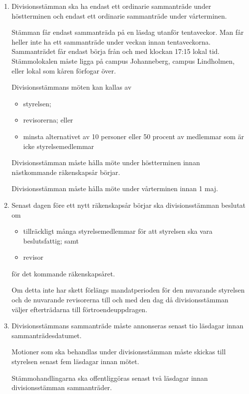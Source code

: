 \documentclass{dvd}
\begin{document}
	\begin{enumerate}[label=\arabic* §, ref=\arabic*]
		\item Divisionsstämman ska ha endast ett ordinarie sammanträde under höstterminen och endast ett ordinarie sammanträde under vårterminen.

		Stämman får endast sammanträda på en läsdag utanför tentaveckor.
		Man får heller inte ha ett sammanträde under veckan innan tentaveckorna.
		Sammanträdet får endast börja från och med klockan 17:15 lokal tid.
		Stämmolokalen måste ligga på campus Johanneberg, campus Lindholmen, eller lokal som kåren förfogar över.

                Divisionsstämmans möten kan kallas av
                \begin{itemize}
                    \item styrelsen;
                    \item revisorerna; eller
                    \item minsta alternativet av 10 personer eller 50 procent av medlemmar som är icke styrelsemedlemmar
                \end{itemize}

                Divisionsstämman måste hålla möte under höstterminen innan nästkommande räkenskapsår börjar.

                Divisionsstämman måste hålla möte under vårterminen innan 1 maj.


		\item Senast dagen före ett nytt räkenskapsår börjar ska divisionsstämman beslutat om
		\begin{itemize}
			\item tillräckligt många styrelsemedlemmar för att styrelsen ska vara beslutsfattig; samt
			\item revisor
		\end{itemize}
		för det kommande räkenskapsåret.

		Om detta inte har skett förlängs mandatperioden för den nuvarande styrelsen och de nuvarande revisorerna till och med den dag då divisionsstämman väljer efterträdarna till förtroendeuppdragen.

		\item Divisionsstämmans sammanträde måste annonseras senast tio läsdagar innan sammanträdesdatumet.

		Motioner som ska behandlas under divisionsstämman måste skickas till styrelsen senast fem läsdagar innan mötet.

		Stämmohandlingarna ska offentliggöras senast två läsdagar innan divisionsstämman sammanträder.


\end{enumerate}
\end{document}
